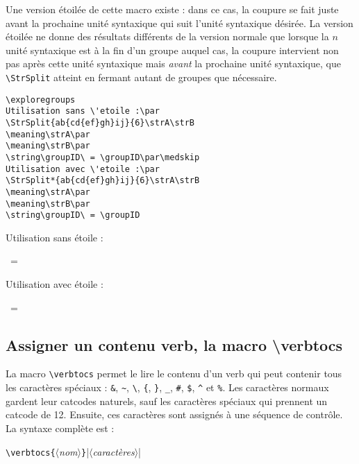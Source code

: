 \documentclass[a4paper,10pt,french]{article}
\newcommand\guill[1]{\og{}#1\fg{}}
\newcommand\argu[1]{$\langle$\textit{#1}$\rangle$}
\newcommand\ARGU[1]{\texttt{\color{black}\{}\argu{#1}\texttt{\color{black}\}}}
\newcommand\US{unité syntaxique\xspace}
\newcommand\styleexercice{\footnotesize}
\newcommand\verbinline{\lstinline[basicstyle=\normalsize\ttfamily]}
\begin{document}
Une version étoilée de cette macro existe : dans ce cas, la coupure se fait juste avant la prochaine \US qui suit l'\US désirée. La version étoilée ne donne des résultats différents de la version normale que lorsque la $n$\ieme{} \US est à la fin d'un groupe auquel cas, la coupure intervient non pas après cette \US mais \emph{avant} la prochaine \US, que \verbinline|\StrSplit| atteint en fermant autant de groupes que nécessaire.\smallskip

\begin{minipage}[c]{0.65\linewidth}
\hfill
\begin{lstlisting}
\exploregroups
Utilisation sans \'etoile :\par
\StrSplit{ab{cd{ef}gh}ij}{6}\strA\strB
\meaning\strA\par
\meaning\strB\par
\string\groupID\ = \groupID\par\medskip
Utilisation avec \'etoile :\par
\StrSplit*{ab{cd{ef}gh}ij}{6}\strA\strB
\meaning\strA\par
\meaning\strB\par
\string\groupID\ = \groupID
\end{lstlisting}%
\end{minipage}\hfill
\begin{minipage}[c]{0.35\linewidth}
	\styleexercice
	\exploregroups
	Utilisation sans étoile :\par
	\strA\strB
	\meaning\strA\par
	\meaning\strB\par
	\string\groupID\ = \groupID\par\medskip
	Utilisation avec \'etoile :\par
	\strA\strB
	\meaning\strA\par
	\meaning\strB\par
	\string\groupID\ = \groupID
\end{minipage}%

\subsection{Assigner un contenu verb, la macro \ttfamily\textbackslash verbtocs}
\label{verbtocs}
La macro \verbinline|\verbtocs| permet le lire le contenu d'un \guill{verb} qui peut contenir tous les caractères spéciaux : \verb|&|, \verb|~|, \verb|\|, \verb|{|, \verb|}|, \verb|_|, \verb|#|, \verb|$|, \verb|^| et \verb|%|. Les caractères \guill{normaux} gardent leur catcodes naturels, sauf les caractères spéciaux qui prennent un catcode de 12. Ensuite, ces caractères sont assignés à une séquence de contrôle. La syntaxe complète est :\par\nobreak\medskip
\hfill\verbinline|\verbtocs|\ARGU{nom}|\argu{caractères}|\hfill{}
\smallskip
\end{document}

